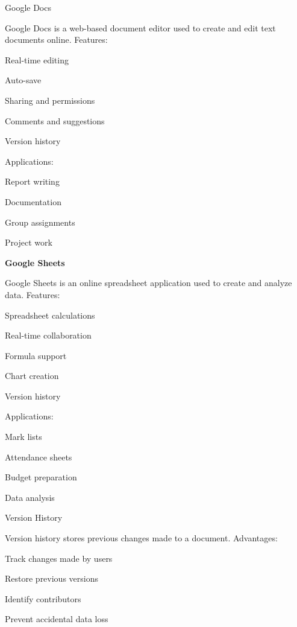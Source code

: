 \documentclass[10pt,a4paper]{article}
\begin{document}
\noindent Google Docs\par
\noindent Google Docs is a web-based document editor used to create and edit text documents online. Features:\par
\noindent\textbullet\; Real-time editing\par
\noindent\textbullet\; Auto-save\par
\noindent\textbullet\; Sharing and permissions\par
\noindent\textbullet\; Comments and suggestions\par
\noindent\textbullet\; Version history\par

\noindent Applications:\par
\clearpage
\noindent\textbullet\; Report writing\par
\noindent\textbullet\; Documentation\par
\noindent\textbullet\; Group assignments\par
\noindent\textbullet\; Project work\par

\medskip\noindent\textbf{Google Sheets}\par
\noindent Google Sheets is an online spreadsheet application used to create and analyze data. Features:\par
\noindent\textbullet\; Spreadsheet calculations\par
\noindent\textbullet\; Real-time collaboration\par
\noindent\textbullet\; Formula support\par
\noindent\textbullet\; Chart creation\par
\noindent\textbullet\; Version history\par

\noindent Applications:\par
\noindent\textbullet\; Mark lists\par
\noindent\textbullet\; Attendance sheets\par
\noindent\textbullet\; Budget preparation\par
\noindent\textbullet\; Data analysis\par

\noindent Version History\par
\noindent Version history stores previous changes made to a document. Advantages:\par
\noindent\textbullet\; Track changes made by users\par
\noindent\textbullet\; Restore previous versions\par
\noindent\textbullet\; Identify contributors\par
\noindent\textbullet\; Prevent accidental data loss\par
\end{document}
